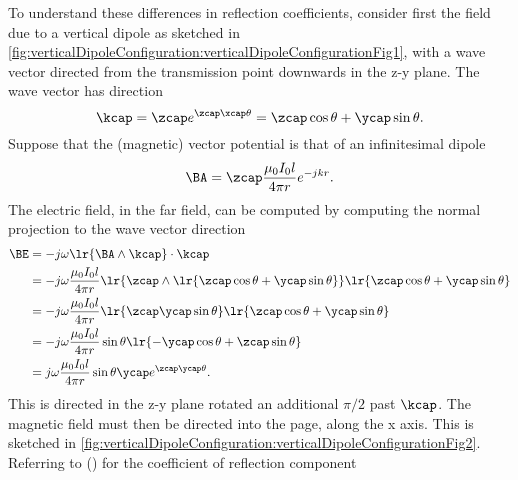 To understand these differences in reflection coefficients, consider first the field due to a vertical dipole as sketched in \cref{fig:verticalDipoleConfiguration:verticalDipoleConfigurationFig1}, with a wave vector directed from the transmission point downwards in the z-y plane.
%
%
The wave vector has direction
%
\begin{equation}\label{eqn:chapter4Notes:560}
\kcap = \zcap e^{\zcap \xcap \theta} = \zcap \cos\theta + \ycap \sin\theta.
\end{equation}
%
Suppose that the (magnetic) vector potential is that of an infinitesimal dipole
%
\begin{equation}\label{eqn:chapter4Notes:580}
\BA = \zcap \frac{\mu_0 I_0 l}{4 \pi r} e^{-j k r}
.
\end{equation}
%
The electric field, in the far field, can be computed by computing the normal projection to the wave vector direction
%
\begin{equation}\label{eqn:chapter4Notes:600}
\begin{aligned}
\BE &= -j \omega \lr{\BA \wedge \kcap} \cdot \kcap
\\ &= -j \omega \frac{\mu_0 I_0 l}{4 \pi r} \lr{\zcap \wedge \lr{\zcap \cos\theta + \ycap \sin\theta} } \lr{\zcap \cos\theta + \ycap \sin\theta}
\\ &= -j \omega \frac{\mu_0 I_0 l}{4 \pi r} \lr{ \zcap \ycap \sin\theta } \lr{\zcap \cos\theta + \ycap \sin\theta}
\\ &= -j \omega \frac{\mu_0 I_0 l}{4 \pi r} \sin\theta \lr{-\ycap \cos\theta + \zcap \sin\theta}
\\ &= j \omega \frac{\mu_0 I_0 l}{4 \pi r} \sin\theta \ycap e^{\zcap \ycap \theta}.
\end{aligned}
\end{equation}
%
This is directed in the z-y plane rotated an additional \( \pi/2 \) past \( \kcap \).  The magnetic field must then be directed into the page, along the x axis.  This is sketched in \cref{fig:verticalDipoleConfiguration:verticalDipoleConfigurationFig2}.
%
%
Referring to \citep{hecht1998hecht} () for the coefficient of reflection component
